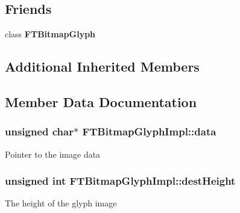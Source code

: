 \subsection*{Friends}
\begin{DoxyCompactItemize}
\item 
class {\bfseries F\+T\+Bitmap\+Glyph}\hypertarget{class_f_t_bitmap_glyph_impl_aa3f0c28a7cfbfa0e896973476f7ed49d}{}\label{class_f_t_bitmap_glyph_impl_aa3f0c28a7cfbfa0e896973476f7ed49d}

\end{DoxyCompactItemize}
\subsection*{Additional Inherited Members}


\subsection{Member Data Documentation}
\subsubsection[{\texorpdfstring{data}{data}}]{\setlength{\rightskip}{0pt plus 5cm}unsigned char$\ast$ F\+T\+Bitmap\+Glyph\+Impl\+::data\hspace{0.3cm}{\ttfamily [private]}}\hypertarget{class_f_t_bitmap_glyph_impl_a5767f85fc8319899d2e180cda2a50c0c}{}\label{class_f_t_bitmap_glyph_impl_a5767f85fc8319899d2e180cda2a50c0c}
Pointer to the \textquotesingle{}image\textquotesingle{} data 
\subsubsection[{\texorpdfstring{dest\+Height}{destHeight}}]{\setlength{\rightskip}{0pt plus 5cm}unsigned int F\+T\+Bitmap\+Glyph\+Impl\+::dest\+Height\hspace{0.3cm}{\ttfamily [private]}}\hypertarget{class_f_t_bitmap_glyph_impl_a77e1fbbf56804d28b6940150eeb82b69}{}\label{class_f_t_bitmap_glyph_impl_a77e1fbbf56804d28b6940150eeb82b69}
The height of the glyph \textquotesingle{}image\textquotesingle{} 
